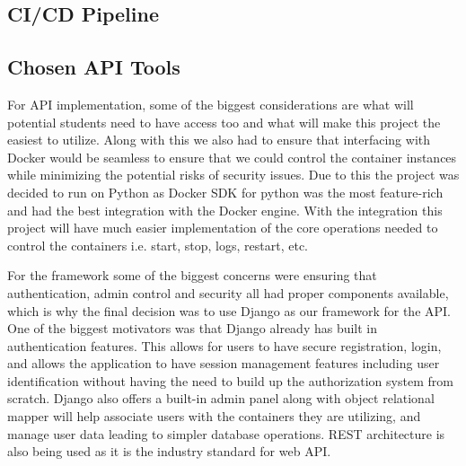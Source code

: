 \documentclass[12pt]{article}
\begin{document}
\subsection{CI/CD Pipeline}

\subsection{Chosen API Tools}
For API implementation, some of the biggest considerations are what will potential students need to have access too and what will make this project the easiest to utilize. Along with this we also had to ensure that interfacing with Docker would be seamless to ensure that we could control the container instances while minimizing the potential risks of security issues. Due to this the project was decided to run on Python as Docker SDK for python was the most feature-rich and had the best integration with the Docker engine. With the integration this project will have much easier implementation of the core operations needed to control the containers i.e. start, stop, logs, restart, etc.

For the framework some of the biggest concerns were ensuring that authentication, admin control and security all had proper components available, which is why the final decision was to use Django as our framework for the API. One of the biggest motivators was that Django already has built in authentication features. This allows for users to have secure registration, login, and allows the application to have session management features including user identification without having the need to build up the authorization system from scratch. Django also offers a built-in admin panel along with object relational mapper will help associate users with the containers they are utilizing, and manage user data leading to simpler database operations. REST architecture is also being used as it is the industry standard for web API.
\end{document}
